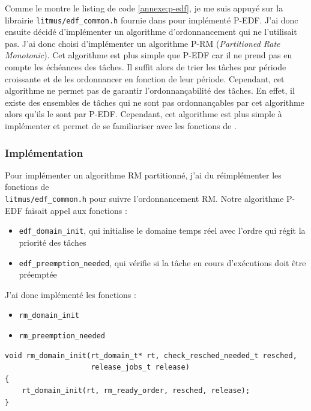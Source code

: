 Comme le montre le listing de code \ref{annexe:p-edf}, je me suis appuyé sur la librairie \texttt{litmus/edf\_common.h} fournie dans \litmus pour implémenté P-EDF. J'ai donc ensuite décidé d'implémenter un algorithme d'ordonnancement qui ne l'utilisait pas. J'ai donc choisi d'implémenter un algorithme P-RM (\textit{Partitioned Rate Monotonic}). Cet algorithme est plus simple que P-EDF car il ne prend pas en compte les échéances des tâches. Il suffit alors de trier les tâches par période croissante et de les ordonnancer en fonction de leur période. Cependant, cet algorithme ne permet pas de garantir l'ordonnançabilité des tâches. En effet, il existe des ensembles de tâches qui ne sont pas ordonnançables par cet algorithme alors qu'ils le sont par P-EDF. Cependant, cet algorithme est plus simple à implémenter et permet de se familiariser avec les fonctions de \litmus.


\subsubsection{Implémentation}

Pour implémenter un algorithme RM partitionné, j'ai du réimplémenter les fonctions de \\ \texttt{litmus/edf\_common.h} pour suivre l'ordonnancement RM. Notre algorithme P-EDF faisait appel aux fonctions :
\begin{itemize}
    \item \texttt{edf\_domain\_init}, qui initialise le domaine temps réel avec l'ordre qui régit la priorité des tâches
    \item \texttt{edf\_preemption\_needed}, qui vérifie si la tâche en cours d'exécutions doit être préemptée
\end{itemize}
J'ai donc implémenté les fonctions :
\begin{itemize}
    \item \texttt{rm\_domain\_init}
    \item \texttt{rm\_preemption\_needed}
\end{itemize}

\begin{lstlisting}[style=cstyle, caption={Fonction \texttt{rm\_domain\_init}}, label={annexe:rm_domain_init}]
void rm_domain_init(rt_domain_t* rt, check_resched_needed_t resched,
					release_jobs_t release)
{
	rt_domain_init(rt, rm_ready_order, resched, release);
}
\end{lstlisting}

